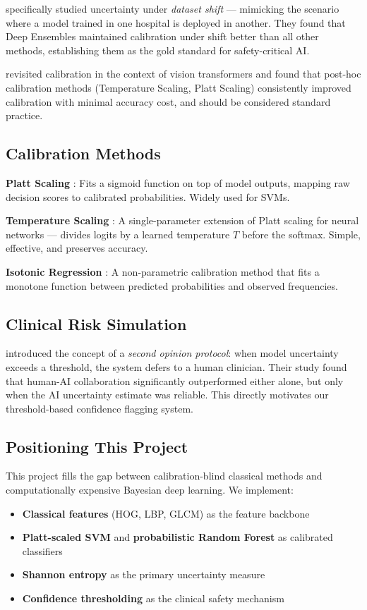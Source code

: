 \documentclass[12pt,a4paper]{article}
\begin{document}
\citet{ovadia2019can} specifically studied uncertainty under \textit{dataset shift} — mimicking the scenario where a model trained in one hospital is deployed in another. They found that Deep Ensembles maintained calibration under shift better than all other methods, establishing them as the gold standard for safety-critical AI.

\citet{minderer2021revisiting} revisited calibration in the context of vision transformers and found that post-hoc calibration methods (Temperature Scaling, Platt Scaling) consistently improved calibration with minimal accuracy cost, and should be considered standard practice.

\subsection{Calibration Methods}

\textbf{Platt Scaling} \citep{platt1999probabilistic}: Fits a sigmoid function on top of model outputs, mapping raw decision scores to calibrated probabilities. Widely used for SVMs.

\textbf{Temperature Scaling} \citep{guo2017calibration}: A single-parameter extension of Platt scaling for neural networks — divides logits by a learned temperature $T$ before the softmax. Simple, effective, and preserves accuracy.

\textbf{Isotonic Regression} \citep{zadrozny2002transforming}: A non-parametric calibration method that fits a monotone function between predicted probabilities and observed frequencies.

\subsection{Clinical Risk Simulation}

\citet{kompa2021second} introduced the concept of a \textit{second opinion protocol}: when model uncertainty exceeds a threshold, the system defers to a human clinician. Their study found that human-AI collaboration significantly outperformed either alone, but only when the AI uncertainty estimate was reliable. This directly motivates our threshold-based confidence flagging system.

\subsection{Positioning This Project}

This project fills the gap between calibration-blind classical methods and computationally expensive Bayesian deep learning. We implement:
\begin{itemize}[noitemsep]
    \item \textbf{Classical features} (HOG, LBP, GLCM) as the feature backbone
    \item \textbf{Platt-scaled SVM} and \textbf{probabilistic Random Forest} as calibrated classifiers
    \item \textbf{Shannon entropy} as the primary uncertainty measure
    \item \textbf{Confidence thresholding} as the clinical safety mechanism
\end{itemize}
\end{document}
